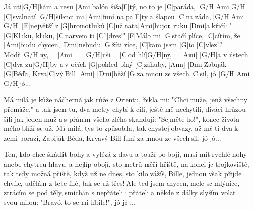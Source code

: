 
\sloka
[C]Já utí[G/H]kám a nesu [Ami]balón šiša[F]tý, no to je [C]paráda, [G/H Ami G/H]
[C]svalnatí [G/H]šílenci mi [Ami]funí na pa[F]ty a šlapou [C]na záda, [G/H Ami G/H]
[F]největší z [G]hromotluků [C]už nata[Ami]hujou ruku
[Dmi]a křičí: "[G]Kluku, kluku, [C]narvem ti [C7]dres!"
[F]Málo mi [G]stačí plíce, [C]cítím, že [Ami]budu chycen,
[Dmi]nebudu [G]žíti více, [C]kam jsem [G]to [C]vlez'?
Modři[G/H]ny, \ \ [Ami]\quad\ \ \ [G/H]uši \ \ [C]od hlí[G/H]ny, \ \ [Ami]
[G/H]a v ústech [C]dva zu[G/H]by \quad [Dmi]a v očích [G]pohled plný [C]záhuby, [Ami]
[Dmi]Zabiják [G]Béďa, Krva[C]vý Bill [Ami]
[Dmi]běží [G]za mnou ze všech [C]sil, jó [G/H Ami G/H]jó...

\sloka
Má milá je kůže nádherná jak růže z Orientu,
řekla mi: "Chci muže, jenž všechny přemůže," a tak jsem tu,
dva metry chybí k cíli, ještě mě nechytili,
diváci hrůzou šílí jak jeden muž
a s přáním všeho zlého skandují: "Sejměte ho!",
konec života mého blíží se už.
Má milá, tys to způsobila,
tak chystej obvazy, až mě ti dva k zemi porazí,
Zabiják Béďa, Krvavý Bill
funí za mnou ze všech sil, jó jó...

\sloka
Ten, kdo chce škádlit bohy a vylézá z davu a touží po boji,
musí mít rychlé nohy anebo chytrou hlavu, a nejlíp obojí,
sto metrů měří hřiště, na konci je trojkoviště,
tak tedy možná příště, když už ne dnes,
sto kilo vážíš, Bille, jednou však přijde chvíle,
udělám z tebe filé, tak se už třes!
Ale teď jsem chycen, mele se mlýnice,
ztrácím se pod těly, smíchán s nepřáteli i přáteli
a někde z dálky slyším volat svou milou:
"Bravó, to se mi líbilo!", jó jó ...
